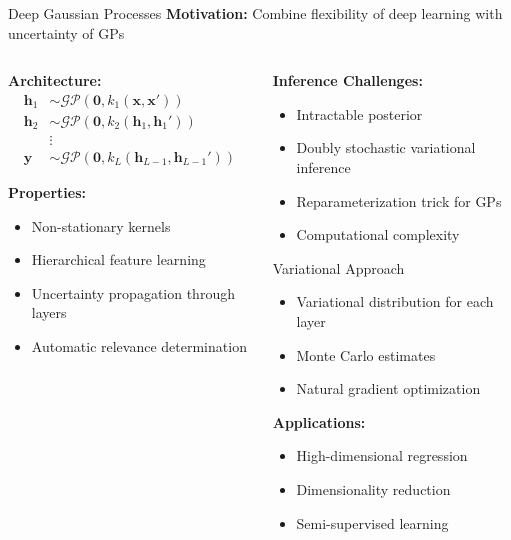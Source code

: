 \documentclass[aspectratio=169,11pt]{beamer}
\newcommand{\GP}{\mathcal{GP}}
\begin{document}
\begin{frame}{Deep Gaussian Processes}
\textbf{Motivation:} Combine flexibility of deep learning with uncertainty of GPs

\begin{columns}
\begin{column}{0.5\textwidth}
\textbf{Architecture:}
\begin{align}
\mathbf{h}_1 &\sim \GP(\mathbf{0}, k_1(\mathbf{x}, \mathbf{x}'))\\
\mathbf{h}_2 &\sim \GP(\mathbf{0}, k_2(\mathbf{h}_1, \mathbf{h}_1'))\\
&\vdots\\
\mathbf{y} &\sim \GP(\mathbf{0}, k_L(\mathbf{h}_{L-1}, \mathbf{h}_{L-1}'))
\end{align}

\textbf{Properties:}
\begin{itemize}
\item Non-stationary kernels
\item Hierarchical feature learning
\item Uncertainty propagation through layers
\item Automatic relevance determination
\end{itemize}
\end{column}
\begin{column}{0.5\textwidth}
\textbf{Inference Challenges:}
\begin{itemize}
\item Intractable posterior
\item Doubly stochastic variational inference
\item Reparameterization trick for GPs
\item Computational complexity
\end{itemize}

\begin{block}{Variational Approach}
\begin{itemize}
\item Variational distribution for each layer
\item Monte Carlo estimates
\item Natural gradient optimization
\end{itemize}
\end{block}

\textbf{Applications:}
\begin{itemize}
\item High-dimensional regression
\item Dimensionality reduction
\item Semi-supervised learning
\end{itemize}
\end{column}
\end{columns}
\end{frame}
\end{document}
